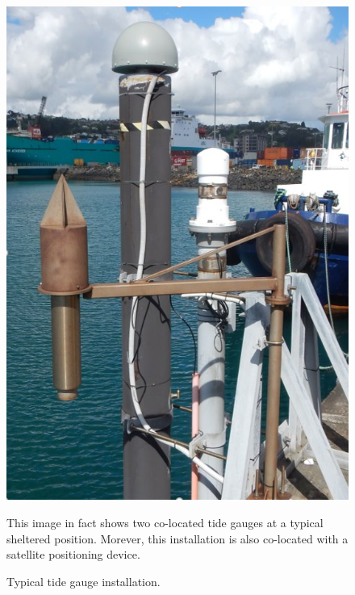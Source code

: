 \begin{figure}[!hbt]\centering
  \includegraphics[width=\figwidthThird]{figures/images/tidegaugeEg.png}
  \caption{Typical tide gauge installation.}{This image in fact shows two co-located tide gauges at a typical sheltered position. Morever, this installation is also co-located with a satellite positioning device.}
  \label{fig:tidegauge}
\end{figure}

